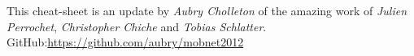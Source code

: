 \documentclass[6pt]{scrartcl}
\begin{document}
\begin{multicols}{4}

\begin{center}
This cheat-sheet is an update by \emph{Aubry Cholleton} of the amazing work of \emph{Julien Perrochet}, \emph{Christopher Chiche} and \emph{Tobias Schlatter}. GitHub:\url{https://github.com/aubry/mobnet2012}
\end{center}
\end{multicols}
\end{document}
